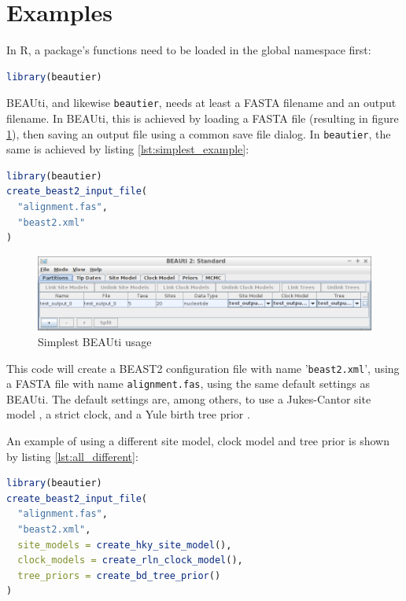 \documentclass{article}
\begin{document}
\section{Examples}

In R, a package's functions need to be loaded in the global namespace first:

\begin{lstlisting}[language=R, caption=Loading, label=lst:loading_beautier, floatplacement=H]
library(beautier)
\end{lstlisting}

BEAUti, and likewise \verb;beautier;, needs at least a FASTA filename
and an output filename. In BEAUti, this is achieved by loading a FASTA file (resulting
in figure \ref{fig:simplest_beauti_usage}), then saving an output file using a common
save file dialog. In \verb;beautier;, the same is achieved by listing \ref{lst:simplest_example}:

\begin{lstlisting}[language=R, caption=Simplest example, label=lst:simplest_example, floatplacement=H]
library(beautier)
create_beast2_input_file(
  "alignment.fas",
  "beast2.xml"
)
\end{lstlisting}

\begin{figure}
  \centering
  \includegraphics[width=\textwidth]{all_default.png}
  \caption{Simplest BEAUti usage}
  \label{fig:simplest_beauti_usage}
\end{figure}

This code will create a BEAST2 configuration file with name '\verb;beast2.xml;',
using a FASTA file with name \verb;alignment.fas;, using the same default settings as BEAUti.
The default settings are, among others, to use a Jukes-Cantor site model \cite{cantor1969mammalian}, 
a strict clock, and a Yule birth tree prior \cite{yule}. 

An example of using a different site model, clock model and tree prior is shown by listing \ref{lst:all_different}:

\begin{lstlisting}[language=R, caption=Example with different site model and clock model and tree prior, label=lst:all_different, floatplacement=H]
library(beautier)
create_beast2_input_file(
  "alignment.fas",
  "beast2.xml",
  site_models = create_hky_site_model(),
  clock_models = create_rln_clock_model(),
  tree_priors = create_bd_tree_prior()
)
\end{lstlisting}
\end{document}
